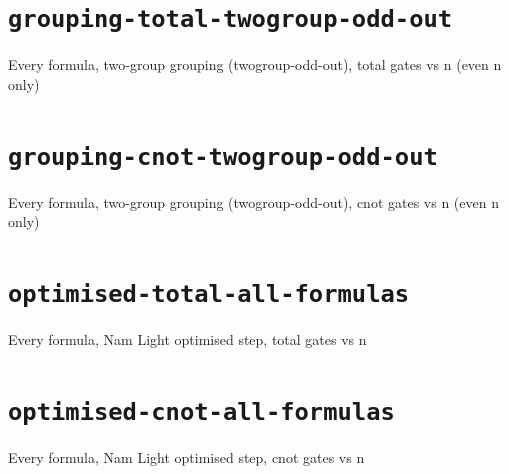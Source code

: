 \documentclass{article}
\begin{document}
\section*{\texttt{grouping-total-twogroup-odd-out}}
Every formula, two-group grouping (twogroup-odd-out), total gates vs n (even n only)\par\medskip

\clearpage

\section*{\texttt{grouping-cnot-twogroup-odd-out}}
Every formula, two-group grouping (twogroup-odd-out), cnot gates vs n (even n only)\par\medskip

\clearpage

\section*{\texttt{optimised-total-all-formulas}}
Every formula, Nam Light optimised step, total gates vs n\par\medskip

\clearpage

\section*{\texttt{optimised-cnot-all-formulas}}
Every formula, Nam Light optimised step, cnot gates vs n\par\medskip

\clearpage
\end{document}
